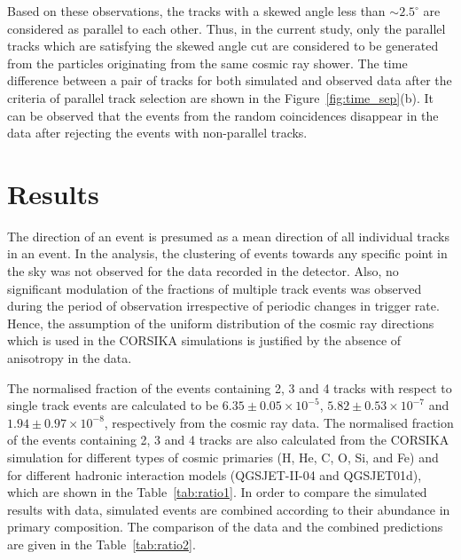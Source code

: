 Based on these observations, the tracks with a skewed angle less than
$\sim 2.5^{\circ}$ are considered as parallel to each other.
Thus, in the current study, only the parallel tracks which are
satisfying the skewed angle cut are considered to be generated
from the particles originating from the same cosmic ray shower.
The time difference between a pair of tracks for both simulated
and observed data after the criteria of parallel track selection
are shown in the Figure~\ref{fig:time_sep}(b). It can be observed
that the events from the random coincidences disappear in the data
after rejecting the events with non-parallel tracks.

\section{Results} \label{sec:result}
The direction of an event is presumed as a mean direction of all
individual tracks in an event. In the analysis, the clustering
of events towards any specific point in the sky was not observed
for the data recorded in the detector. Also, no significant
modulation of the fractions of multiple track events was observed
during the period of observation irrespective of periodic changes
in trigger rate. 
Hence, the assumption of the uniform distribution of the cosmic ray
directions which is used in the CORSIKA simulations is justified
by the absence of anisotropy in the data.

The normalised fraction of the events containing 2, 3 and 4 tracks
with respect to single track events are calculated to be
$6.35\pm 0.05\times 10^{-5}$, $5.82\pm 0.53\times 10^{-7}$ and
$1.94\pm 0.97\times 10^{-8}$, respectively from the cosmic ray data.
The normalised fraction of the events containing 2, 3 and 4 tracks
are also calculated from the CORSIKA simulation for different types
of cosmic primaries (H, He, C, O, Si, and Fe) and for different
hadronic interaction models (QGSJET-II-04 and QGSJET01d), which are
shown in the Table~\ref{tab:ratio1}. In order to compare the simulated
results with data, simulated events are combined according to their
abundance in primary composition\cite{cosmic1,pdgspectra1}. The
comparison of the data and the combined predictions are given in
the Table~\ref{tab:ratio2}.

